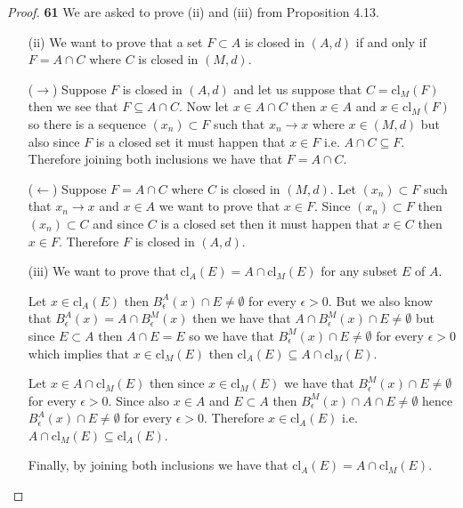 \documentclass[11pt]{article}
\newcommand{\cl}{\text{cl}}
\theoremstyle{definition}
\begin{document}
    \begin{proof}{\textbf{61}}
        We are asked to prove (ii) and (iii) from Proposition 4.13.
        \begin{itemize}
        \item [(ii)] We want to prove that a set $F \subset A$ is closed in
        $(A,d)$ if and only if $F = A \cap C$ where $C$ is closed in $(M,d)$.

        ($\rightarrow$) Suppose $F$ is closed in $(A,d)$ and let us suppose that
        $C = \cl_{M}(F)$ then we see that $F \subseteq A \cap C$. Now let
        $x \in A \cap C$ then $x \in A$ and $x \in \cl_{M}(F)$ so there is a
        sequence $(x_n) \subset F$ such that $x_n \to x$ where $x \in (M,d)$ but
        also since $F$ is a closed set it must happen that $x\in F$ i.e.
        $A \cap C \subseteq F$.
        Therefore joining both inclusions we have that $F = A \cap C$.
        
        ($\leftarrow$) Suppose $F = A \cap C$ where $C$ is closed in $(M,d)$.
        Let $(x_n) \subset F$ such that $x_n \to x$ and $x \in A$ we want to prove
        that $x \in F$. Since $(x_n) \subset F$ then $(x_n) \subset C$ and since
        $C$ is a closed set then it must happen that $x \in C$ then
        $x \in F$. Therefore $F$ is closed in $(A,d)$.
        
        \item [(iii)] We want to prove that $\cl_A(E) = A \cap \cl_M(E)$ for any
        subset $E$ of $A$.

        Let $x \in \cl_A(E)$ then $B_{\epsilon}^A(x) \cap E \neq \emptyset$ for
        every $\epsilon > 0$. But we also know that
        $B_{\epsilon}^A(x) = A \cap B_{\epsilon}^M(x)$ then we have that
        $A \cap B_{\epsilon}^M(x) \cap E \neq \emptyset$
        but since $E \subset A$ then $A \cap E = E$ so we have that
        $B_{\epsilon}^M(x) \cap E \neq \emptyset$ for every $\epsilon > 0$
        which implies that $x \in \cl_M(E)$ then
        $\cl_A(E) \subseteq A \cap \cl_M(E)$.

        Let $x \in A \cap \cl_M(E)$ then since $x \in \cl_M(E)$ we have that
        $B_\epsilon^M(x) \cap E \neq \emptyset$ for every $\epsilon > 0$.
        Since also $x \in A$ and $E \subset A$ then
        $B_\epsilon^M(x) \cap A \cap E \neq \emptyset$ hence
        $B_\epsilon^A(x) \cap E \neq \emptyset$ for every $\epsilon > 0$.
        Therefore $x \in \cl_A(E)$ i.e. $A \cap \cl_M(E) \subseteq \cl_A(E)$.
        
        Finally, by joining both inclusions we have that
        $\cl_A(E) = A \cap \cl_M(E)$.
        \end{itemize}
    \end{proof}
\end{document}
